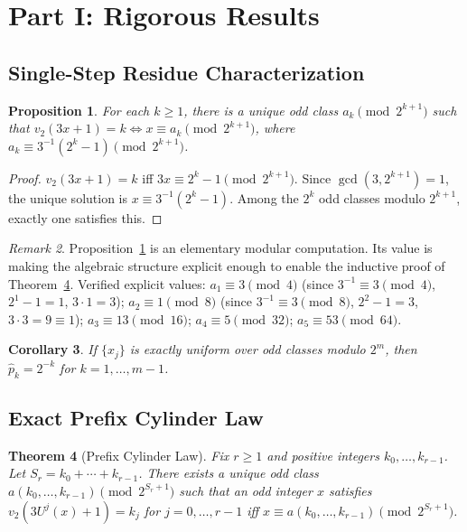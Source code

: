 \documentclass[12pt]{article}
\newtheorem{theorem}{Theorem}
\newtheorem{proposition}[theorem]{Proposition}
\newtheorem{corollary}[theorem]{Corollary}
\theoremstyle{definition}
\theoremstyle{remark}
\newtheorem{remark}[theorem]{Remark}
\begin{document}
\section{Part I: Rigorous Results}

\subsection{Single-Step Residue Characterization}

\begin{proposition}\label{prop:residue}
For each $k\geq 1$, there is a unique odd class
$a_k\pmod{2^{k+1}}$ such that $v_2(3x+1)=k\iff
x\equiv a_k\pmod{2^{k+1}}$, where
$a_k\equiv 3^{-1}(2^k-1)\pmod{2^{k+1}}$.
\end{proposition}

\begin{proof}
$v_2(3x+1)=k$ iff $3x\equiv 2^k-1\pmod{2^{k+1}}$.
Since $\gcd(3,2^{k+1})=1$, the unique solution is $x\equiv 3^{-1}(2^k-1)$.
Among the $2^k$ odd classes modulo $2^{k+1}$, exactly one satisfies this.
\end{proof}

\begin{remark}
Proposition~\ref{prop:residue} is an elementary modular computation.
Its value is making the algebraic structure explicit enough to enable
the inductive proof of Theorem~\ref{thm:prefix}.
Verified explicit values:
$a_1\equiv 3\pmod{4}$ (since $3^{-1}\equiv 3\pmod{4}$,
$2^1-1=1$, $3\cdot 1=3$);
$a_2\equiv 1\pmod{8}$ (since $3^{-1}\equiv 3\pmod{8}$,
$2^2-1=3$, $3\cdot 3=9\equiv 1$);
$a_3\equiv 13\pmod{16}$;
$a_4\equiv 5\pmod{32}$;
$a_5\equiv 53\pmod{64}$.
\end{remark}

\begin{corollary}\label{cor:geometric}
If $\{x_j\}$ is exactly uniform over odd classes modulo $2^m$,
then $\hat{p}_k=2^{-k}$ for $k=1,\ldots,m-1$.
\end{corollary}

\subsection{Exact Prefix Cylinder Law}

\begin{theorem}[Prefix Cylinder Law]\label{thm:prefix}
Fix $r\geq 1$ and positive integers $k_0,\ldots,k_{r-1}$.
Let $S_r=k_0+\cdots+k_{r-1}$.
There exists a unique odd class
$a(k_0,\ldots,k_{r-1})\pmod{2^{S_r+1}}$ such that an odd integer $x$
satisfies $v_2(3U^j(x)+1)=k_j$ for $j=0,\ldots,r-1$ iff
$x\equiv a(k_0,\ldots,k_{r-1})\pmod{2^{S_r+1}}$.
\end{theorem}
\end{document}
